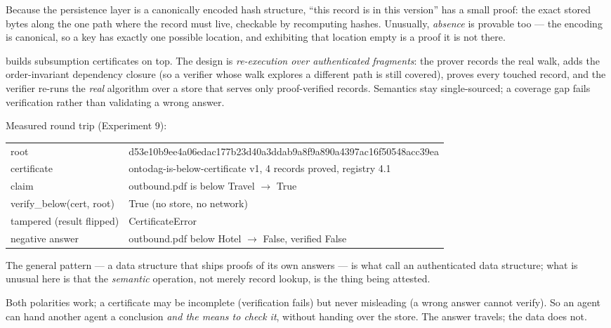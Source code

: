 Because the persistence layer is a canonically encoded hash structure, ``this
record is in this version'' has a small proof: the exact stored bytes along
the one path where the record must live, checkable by recomputing hashes.
Unusually, \emph{absence} is provable too --- the encoding is canonical, so a
key has exactly one possible location, and exhibiting that location empty is a
proof it is not there.

\odag{} builds subsumption certificates on top. The design is
\emph{re-execution over authenticated fragments}: the prover records the real
 walk, adds the order-invariant dependency closure (so a
verifier whose walk explores a different path is still covered), proves every
touched record, and the verifier re-runs the \emph{real} algorithm over a
store that serves only proof-verified records. Semantics stay single-sourced;
a coverage gap fails verification rather than validating a wrong answer.

\begin{measured}
Measured round trip (Experiment 9):
\begin{center}\ttfamily\footnotesize
\begin{tabular}{@{}ll@{}}
root & d53e10b9ee4a06edac177b23d40a3ddab9a8f9a890a4397ac16f50548acc39ea\\
certificate & ontodag-is-below-certificate v1, 4 records proved,
  registry 4.1\\
claim & outbound.pdf is below Travel $\to$ True\\
verify\_below(cert, root) & True \quad (no store, no network)\\
tampered (result flipped) & CertificateError\\
negative answer & outbound.pdf below Hotel $\to$ False, verified False\\
\end{tabular}
\end{center}
\end{measured}

The general pattern --- a data structure that ships proofs of its own answers
--- is what \citet{miller2014} call an authenticated data structure; what is
unusual here is that the \emph{semantic} operation, not merely record lookup,
is the thing being attested.

Both polarities work; a certificate may be incomplete (verification fails) but
never misleading (a wrong answer cannot verify). So an agent can hand another
agent a conclusion \emph{and the means to check it}, without handing over the
store. The answer travels; the data does not.

